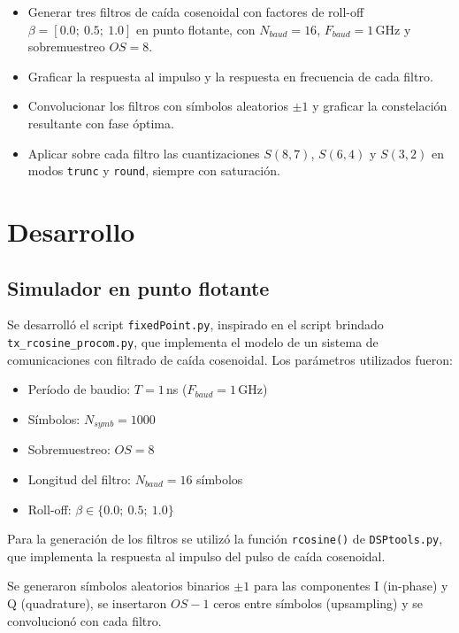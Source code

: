 \documentclass[11pt,a4paper]{article}
\begin{document}
\begin{itemize}
    \item Generar tres filtros de caída cosenoidal con factores de roll-off $\beta =
              [0.0;\ 0.5;\ 1.0]$ en punto flotante, con $N_{baud} = 16$, $F_{baud} = 1$\,GHz
          y sobremuestreo $OS = 8$.
    \item Graficar la respuesta al impulso y la respuesta en frecuencia de cada filtro.
    \item Convolucionar los filtros con símbolos aleatorios $\pm 1$ y graficar la
          constelación resultante con fase óptima.
    \item Aplicar sobre cada filtro las cuantizaciones $S(8,7)$, $S(6,4)$ y $S(3,2)$ en
          modos \texttt{trunc} y \texttt{round}, siempre con saturación.
\end{itemize}

\section{Desarrollo}

\subsection{Simulador en punto flotante}

Se desarrolló el script \texttt{fixedPoint.py}, inspirado en el script brindado
\texttt{tx\_rcosine\_procom.py}, que implementa el modelo de un sistema de
comunicaciones con filtrado de caída cosenoidal. Los parámetros utilizados
fueron:

\begin{itemize}
    \item Período de baudio: $T = 1$\,ns ($F_{baud} = 1$\,GHz)
    \item Símbolos: $N_{symb} = 1000$
    \item Sobremuestreo: $OS = 8$
    \item Longitud del filtro: $N_{baud} = 16$ símbolos
    \item Roll-off: $\beta \in \{0.0;\ 0.5;\ 1.0\}$
\end{itemize}

Para la generación de los filtros se utilizó la función \texttt{rcosine()} de
\texttt{DSPtools.py}, que implementa la respuesta al impulso del pulso de caída
cosenoidal.

Se generaron símbolos aleatorios binarios $\pm 1$ para las componentes I
(in-phase) y Q (quadrature), se insertaron $OS-1$ ceros entre símbolos
(upsampling) y se convolucionó con cada filtro.
\end{document}
